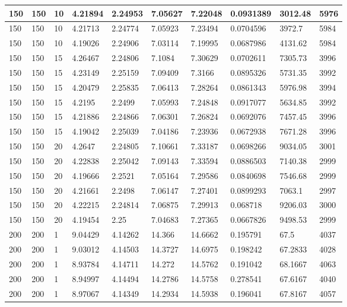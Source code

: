 \begin{landscape}
\begin{longtable}{ | l | l | l | l | l | l | l | l | l | l | }
150 & 150 & 10 & 4.21894 & 2.24953 & 7.05627 & 7.22048 & 0.0931389 & 3012.48 & 5976\\ \hline
150 & 150 & 10 & 4.21713 & 2.24774 & 7.05923 & 7.23494 & 0.0704596 & 3972.7 & 5984\\ \hline
150 & 150 & 10 & 4.19026 & 2.24906 & 7.03114 & 7.19995 & 0.0687986 & 4131.62 & 5984\\ \hline
150 & 150 & 15 & 4.26467 & 2.24806 & 7.1084 & 7.30629 & 0.0702611 & 7305.73 & 3996\\ \hline
150 & 150 & 15 & 4.23149 & 2.25159 & 7.09409 & 7.3166 & 0.0895326 & 5731.35 & 3992\\ \hline
150 & 150 & 15 & 4.20479 & 2.25835 & 7.06413 & 7.28264 & 0.0861343 & 5976.98 & 3994\\ \hline
150 & 150 & 15 & 4.2195 & 2.2499 & 7.05993 & 7.24848 & 0.0917077 & 5634.85 & 3992\\ \hline
150 & 150 & 15 & 4.21886 & 2.24866 & 7.06301 & 7.26824 & 0.0692076 & 7457.45 & 3996\\ \hline
150 & 150 & 15 & 4.19042 & 2.25039 & 7.04186 & 7.23936 & 0.0672938 & 7671.28 & 3996\\ \hline
150 & 150 & 20 & 4.2647 & 2.24805 & 7.10661 & 7.33187 & 0.0698266 & 9034.05 & 3001\\ \hline
150 & 150 & 20 & 4.22838 & 2.25042 & 7.09143 & 7.33594 & 0.0886503 & 7140.38 & 2999\\ \hline
150 & 150 & 20 & 4.19666 & 2.2521 & 7.05164 & 7.29586 & 0.0840698 & 7546.68 & 2999\\ \hline
150 & 150 & 20 & 4.21661 & 2.2498 & 7.06147 & 7.27401 & 0.0899293 & 7063.1 & 2997\\ \hline
150 & 150 & 20 & 4.22215 & 2.24814 & 7.06875 & 7.29913 & 0.068718 & 9206.03 & 3000\\ \hline
150 & 150 & 20 & 4.19454 & 2.25 & 7.04683 & 7.27365 & 0.0667826 & 9498.53 & 2999\\ \hline
200 & 200 & 1 & 9.04429 & 4.14262 & 14.366 & 14.6662 & 0.195791 & 67.5 & 4037\\ \hline
200 & 200 & 1 & 9.03012 & 4.14503 & 14.3727 & 14.6975 & 0.198242 & 67.2833 & 4028\\ \hline
200 & 200 & 1 & 8.93784 & 4.14711 & 14.272 & 14.5762 & 0.191042 & 68.1667 & 4063\\ \hline
200 & 200 & 1 & 8.94997 & 4.14494 & 14.2786 & 14.5758 & 0.278541 & 67.6167 & 4040\\ \hline
200 & 200 & 1 & 8.97067 & 4.14349 & 14.2934 & 14.5938 & 0.196041 & 67.8167 & 4057\\ \hline

\end{longtable}
\end{landscape}
